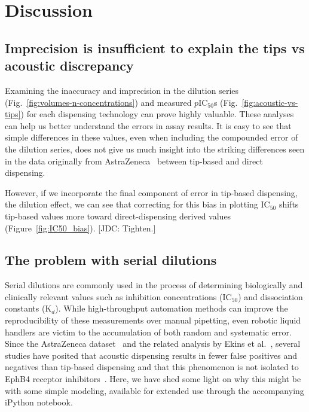 \documentclass[aps,pre,twocolumn,nofootinbib,superscriptaddress,linenumbers]{revtex4-1}
\begin{document}
\section{Discussion}

\subsection*{Imprecision is insufficient to explain the tips vs acoustic discrepancy}

Examining the inaccuracy and imprecision in the dilution series (Fig.~\ref{fig:volumes-n-concentrations}) and measured $p$IC$_{50}$s (Fig.~\ref{fig:acoustic-vs-tips}) for each dispensing technology can prove highly valuable.
These analyses can help us better understand the errors in assay results.
It is easy to see that simple differences in these values, even when including the compounded error of the dilution series, does not give us much insight into the striking differences seen in the data originally from AstraZeneca~\cite{ekins_dispensing_2013,barlaam_novel_2009,barlaam_pyrimidine_2010} between tip-based and direct dispensing.

However, if we incorporate the final component of error in tip-based dispensing, the dilution effect, we can see that correcting for this bias in plotting IC$_{50}$ shifts tip-based values more toward direct-dispensing derived values (Figure~\ref{fig:IC50_bias}).
{\color{red}[JDC: Tighten.]}

\subsection*{The problem with serial dilutions}

Serial dilutions are commonly used in the process of determining biologically and clinically relevant values such as inhibition concentrations (IC$_{ 50}$)  and dissociation constants (K$_{d}$). 
While high-throughput automation methods can improve the reproducibility of these measurements over manual pipetting, even robotic liquid handlers are victim to the accumulation of both random and systematic error.
Since the AstraZeneca dataset~\cite{barlaam_novel_2009,barlaam_pyrimidine_2010} and the related analysis by Ekins et al.~\cite{ekins_dispensing_2013}, several studies have posited that acoustic dispensing results in fewer false positives and negatives than tip-based dispensing and that this phenomenon is not isolated to EphB4 receptor inhibitors~\cite{wingfield_impact_2012,olechno_direct_2013,olechno_sound_2013,olechno_improving_2006}. 
Here, we have shed some light on why this might be with some simple modeling, available for extended use through the accompanying iPython notebook.
\end{document}
